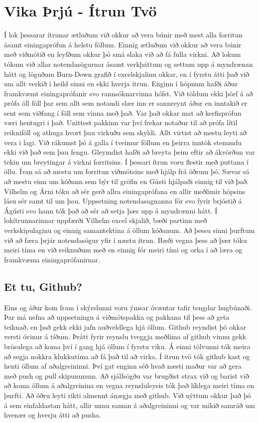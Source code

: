 \documentclass[a4paper,10pt]{article}
\begin{document}
\section{Vika Þrjú - Ítrun Tvö}
Í lok þessarar ítrunar ætluðum við okkur að vera búnir með mest alla forritun ásamt einingaprófun á helstu föllum.  Einnig ætluðum við okkur að vera búnir með viðmótið en leyfðum okkur þó smá slaka við að fá fulla virkni.  Að lokum tókum við allar notendasögurnar ásamt verkþáttum og settum upp á myndrænan hátt og löguðum Burn-Down grafið í excelskjalinu okkar, en í fyrstu átti það við um allt verkið í heild sinni en ekki hverja ítrun.   
Enginn í hópnum hafði áður framkvæmt einingaprófanir svo rannsóknarvinna hófst.  Við töldum ekki þörf á að prófa öll föll þar sem allt sem notandi slær inn er sannreynt áður en inntakið er sent sem viðfang í föll sem vinna með það.  Var það okkar mat að kerfisprófun væri hentugri i það.  Unittest pakkinn var því frekar notaður til að prófa lítil reikniföll og athuga hvort þau virkuðu sem skyldi.  Allt virtist að mestu leyti að vera i lagi.  Við rákumst þó á galla í tveimur föllum en þeirra inntök stemmdu ekki við það sem þau fengu.  Gleymdist hafði að breyta þeim eftir að ákvörðun var tekin um breytingar á virkni forritsins.  Í þessari ítrun voru flestir með puttana í öllu.  Ívan sá að mestu um forritun viðmótsins með hjálp frá öðrum þó.  Sævar sá að mestu einn um kóðann sem býr til gröfin en Gústi hjálpaði einnig til við það.  Vilhelm og Árni tóku að sér gerð allra einingaprófana en allir meðlimir hópsins lásu sér samt til um þau.  Uppsetning notendasagnanna fór svo fyrir brjóstið á Ágústi svo hann tók það að sér að setja þær upp á myndrænni hátt.  Í lokítrunnarinnar uppfærði Vilhelm excel skjalið, bæði partinn með verkskipulaginu og einnig samantektina á öllum kóðanum.  
Að þessu sinni þurftum við að færa þrjár notendasögur yfir í næstu ítrun.  Bæði vegna þess að þær tóku meiri tíma en við reiknuðum með en einnig fór meiri tími og orka í að læra og framkvæma einingaprófanirnar.

\subsection{Et tu, Github?}
Eins og áður kom fram í skýrslunni voru ýmsar óvæntar tafir tengdar hugbúnaði.  Þar má nefna að uppsetningu á viðmótspakka og pakkana til þess að geta teiknað, en það gekk ekki jafn auðveldlega hjá öllum.  Github reyndist þó okkar versti óvinur á tíðum.  Þrátt fyrir reynslu tveggja meðlima af github vinnu gekk brösulega að koma því í gang hjá öllum í fyrstu viku.  Á einni tölvunni tók meira að segja nokkra klukkutíma að fá það til að virka.  Í ítrun tvö tók github kast og henti öllum af aðalgreininni.  Því gat enginn séð hvað næsti maður var að gera með push og pull skipununum.  Að sjálfsögðu var brugðist strax við og barist við að koma öllum á aðalgreinina en vegna reynsluleysis tók það líklega meiri tíma en þurfti.  Að öðru leyti rikti almennt ánægja með github.  Við nýttum okkur það þó á sem einfaldastan hátt, allir unnu saman á aðalgreininni og var mikið samráð um hvenær og hverju átti að pusha.
\end{document}
